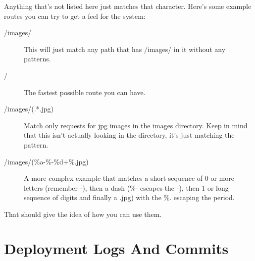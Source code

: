 Anything that's not listed here just matches that character.  Here's some example routes you can try to get
a feel for the system:

\begin{description}
\item [/images/]  This will just match any path that has /images/ in it without any patterns.
\item [/] The fastest possible route you can have.
\item [/images/(.*.jpg)] Match only requests for jpg images in the images directory.  Keep in mind that this
    isn't actually looking in the directory, it's just matching the  pattern.
\item [/images/(\%a-\%-\%d+\%.jpg)] A more complex example that matches a short sequence of 0 or more letters (remember -), then a dash
    (\%- escapes the -), then 1 or long sequence of digits and finally a .jpg) with the \%. escaping the period.
\end{description}

That should give the idea of how you can use them.


\section{Deployment Logs And Commits}






